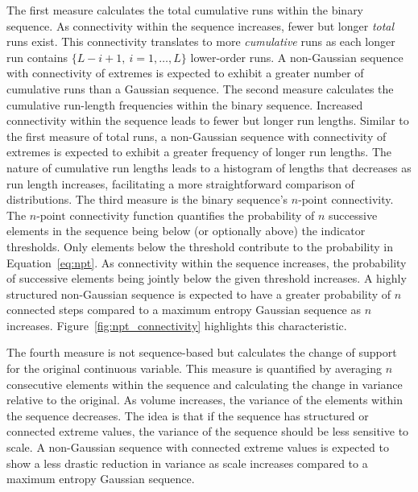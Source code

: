 The first measure calculates the total cumulative runs within the binary sequence. As connectivity within the sequence increases, fewer but longer \emph{total} runs exist. This connectivity translates to more \emph{cumulative} runs as each longer run contains $\{L-i+1, \ i=1,\dots,L\}$ lower-order runs. A non-Gaussian sequence with connectivity of extremes is expected to exhibit a greater number of cumulative runs than a Gaussian sequence. The second measure calculates the cumulative run-length frequencies within the binary sequence. Increased connectivity within the sequence leads to fewer but longer run lengths. Similar to the first measure of total runs, a non-Gaussian sequence with connectivity of extremes is expected to exhibit a greater frequency of longer run lengths. The nature of cumulative run lengths leads to a histogram of lengths that decreases as run length increases, facilitating a more straightforward comparison of distributions. The third measure is the binary sequence's $n\text{-point}$ connectivity. The $n\text{-point}$ connectivity function quantifies the probability of $n$ successive elements in the sequence being below (or optionally above) the indicator thresholds. Only elements below the threshold contribute to the probability in Equation~\ref{eq:npt}. As connectivity within the sequence increases, the probability of successive elements being jointly below the given threshold increases. A highly structured non-Gaussian sequence is expected to have a greater probability of $n$ connected steps compared to a maximum entropy Gaussian sequence as $n$ increases. Figure~\ref{fig:npt_connectivity} highlights this characteristic.

The fourth measure is not sequence-based but calculates the change of support for the original continuous variable. This measure is quantified by averaging $n$ consecutive elements within the sequence and calculating the change in variance relative to the original. As volume increases, the variance of the elements within the sequence decreases. The idea is that if the sequence has structured or connected extreme values, the variance of the sequence should be less sensitive to scale. A non-Gaussian sequence with connected extreme values is expected to show a less drastic reduction in variance as scale increases compared to a maximum entropy Gaussian sequence.

